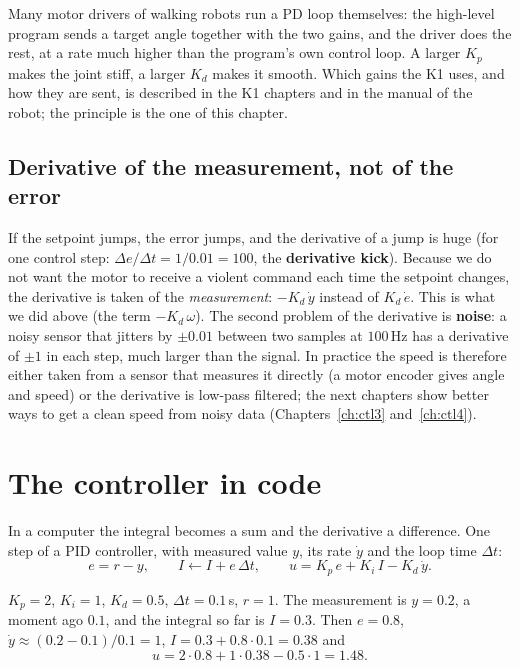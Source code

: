 \begin{aibox}
Many motor drivers of walking robots run a PD loop themselves: the high-level program sends a target angle together with the two gains, and the driver does the rest, at a rate much higher than the program's own control loop. A larger $K_p$ makes the joint stiff, a larger $K_d$ makes it smooth. Which gains the K1 uses, and how they are sent, is described in the K1 chapters and in the manual of the robot; the principle is the one of this chapter.
\end{aibox}

\subsection*{Derivative of the measurement, not of the error}
If the setpoint jumps, the error jumps, and the derivative of a jump is huge (for one control step: $\Delta e/\Delta t=1/0.01=100$, the \textbf{derivative kick}). Because we do not want the motor to receive a violent command each time the setpoint changes, the derivative is taken of the \emph{measurement}: $-K_d\,\dot y$ instead of $K_d\,\dot e$. This is what we did above (the term $-K_d\,\omega$). The second problem of the derivative is \textbf{noise}: a noisy sensor that jitters by $\pm0.01$ between two samples at $100$\,Hz has a derivative of $\pm1$ in each step, much larger than the signal. In practice the speed is therefore either taken from a sensor that measures it directly (a motor encoder gives angle and speed) or the derivative is low-pass filtered; the next chapters show better ways to get a clean speed from noisy data (Chapters~\ref{ch:ctl3} and~\ref{ch:ctl4}).

\section*{The controller in code}
In a computer the integral becomes a sum and the derivative a difference. One step of a PID controller, with measured value $y$, its rate $\dot y$ and the loop time $\Delta t$:
\[
e=r-y,\qquad I\leftarrow I+e\,\Delta t,\qquad u=K_p\,e+K_i\,I-K_d\,\dot y .
\]

\begin{example}
$K_p=2$, $K_i=1$, $K_d=0.5$, $\Delta t=0.1$\,s, $r=1$. The measurement is $y=0.2$, a moment ago $0.1$, and the integral so far is $I=0.3$. Then $e=0.8$, $\dot y\approx(0.2-0.1)/0.1=1$, $I=0.3+0.8\cdot0.1=0.38$ and
\[
u=2\cdot0.8+1\cdot0.38-0.5\cdot1=1.48 .
\]
\end{example}

